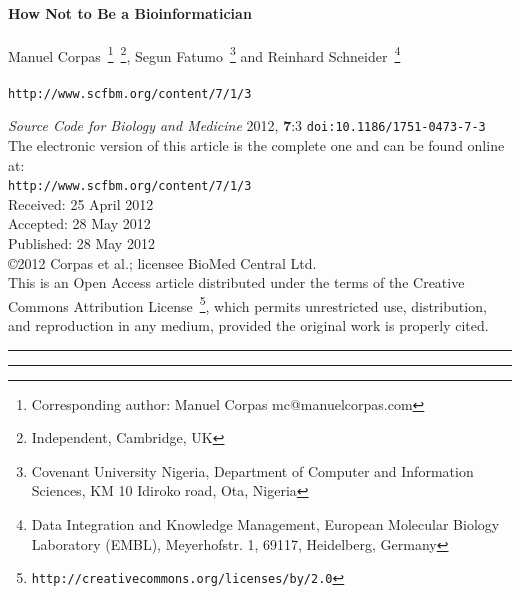 \documentclass[11pt,twoside,a4paper]{article}
\begin{document}
\setlength\parindent{0pt}

~\\

\begin{center}
	\textbf{\LARGE How Not to Be a Bioinformatician}~\\
	~\\
	Manuel Corpas~\footnote{Corresponding author: Manuel Corpas mc@manuelcorpas.com}~\footnote{Independent, Cambridge, UK}, Segun Fatumo~\footnote{Covenant University Nigeria, Department of Computer and Information Sciences, KM 10 Idiroko road, Ota, Nigeria} and Reinhard Schneider~\footnote{Data Integration and Knowledge Management, European Molecular Biology Laboratory (EMBL), Meyerhofstr. 1, 69117, Heidelberg, Germany}~\\
	~\\
	\texttt{http://www.scfbm.org/content/7/1/3}
\end{center}	

\emph{Source Code for Biology and Medicine} 2012, \textbf{7}:3 \texttt{doi:10.1186/1751-0473-7-3}~\\

The electronic version of this article is the complete one and can be found online at: ~\\
\texttt{http://www.scfbm.org/content/7/1/3}~\\

Received:	25 April 2012~\\
Accepted:	28 May 2012~\\
Published:	28 May 2012~\\

\copyright 2012 Corpas et al.; licensee BioMed Central Ltd.~\\

This is an Open Access article distributed under the terms of the Creative Commons Attribution License~\footnote{\texttt{http://creativecommons.org/licenses/by/2.0}}, which permits unrestricted use, distribution, and reproduction in any medium, provided the original work is properly cited.~\\

\begin{center} \rule{10cm}{0.01cm} \end{center}

\tableofcontents

\begin{center} \rule{10cm}{0.01cm} \end{center}
\end{document}
